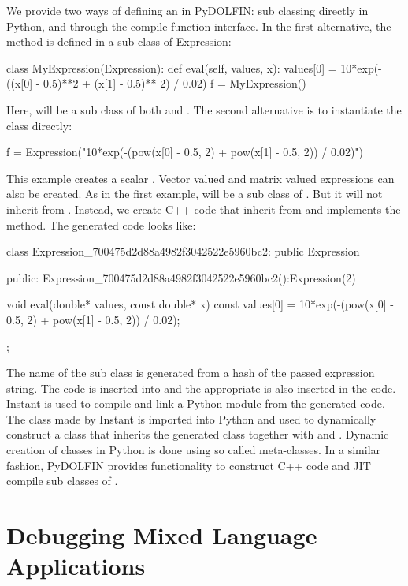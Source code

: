 We provide two ways of defining an  in PyDOLFIN: sub
classing  directly in Python, and through the compile
function interface. In the first alternative, the  method is defined in a sub class of Expression:
\begin{python}
class MyExpression(Expression):
    def eval(self, values, x):
        values[0] = 10*exp(-((x[0] - 0.5)**2 + (x[1] - 0.5)** 2) / 0.02)
f = MyExpression()
\end{python}
Here,  will be a sub class of both  and
.  The second alternative is to instantiate the  class directly:
\begin{c++}
f = Expression("10*exp(-(pow(x[0] - 0.5, 2) + pow(x[1] - 0.5, 2)) / 0.02)")
\end{c++}
This example creates a scalar . Vector valued and matrix
valued expressions can also be created. As in the first example, 
 will be a sub class of . But it will not
inherit from . 
Instead, we create C++ code that inherit from  and implements the  method. 
The generated code looks like:
\begin{c++}
class Expression_700475d2d88a4982f3042522e5960bc2: public Expression{
public:
  Expression_700475d2d88a4982f3042522e5960bc2():Expression(2){}

  void eval(double* values, const double* x) const{
    values[0] = 10*exp(-(pow(x[0] - 0.5, 2) + pow(x[1] - 0.5, 2)) / 0.02);
  }
};
\end{c++}
The name of the sub class is generated from a hash of the passed expression
string. The code is inserted into  and the
appropriate  is also inserted in the code. Instant is used
to compile and link a Python module from the generated code. The class made
by Instant is imported into Python and used to dynamically construct a class 
that inherits the generated class together with  and . 
Dynamic creation of classes in Python is done using so called meta-classes. 
In a similar fashion,  PyDOLFIN provides functionality to construct C++
code and JIT compile sub classes of .


\section{Debugging Mixed Language Applications}

